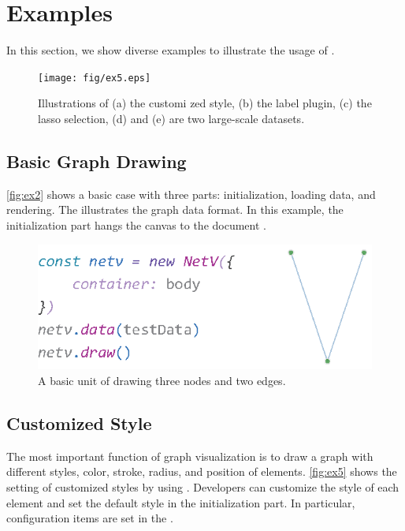 \section{Examples}
In this section, we show diverse examples to illustrate the usage of \name.
\begin{figure}
    \texttt{[image: fig/ex5.eps]}
    \caption{
        Illustrations of (a) the customi    zed style, (b) the label plugin, (c) the lasso selection, (d) and (e) are two large-scale datasets.
    }
    \label{fig:ex5}
\end{figure}

\subsection{Basic Graph Drawing}
\autoref{fig:ex2} shows a basic case with three parts: initialization, loading data, and rendering. The  illustrates the graph data format. In this example, the initialization part hangs the canvas to the document .
\begin{figure}
    \includegraphics[width=\linewidth]{fig/ex2.eps}
    \caption{
        A basic unit of drawing three nodes and two edges.
    }
    \label{fig:ex2}
\end{figure}

\subsection{Customized Style}
The most important function of graph visualization is to draw a graph with different styles,   color, stroke, radius, and position of elements.
\autoref{fig:ex5} shows the setting of customized styles by using \name. Developers can customize the style of each element and set the default style in the initialization part. In particular,  configuration items are set in the .


